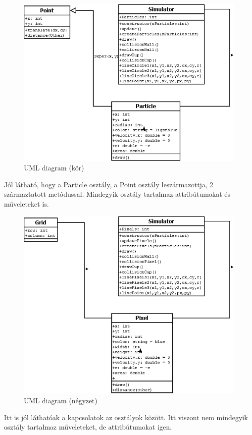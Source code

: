 \begin{figure}[h]
	\centering
	\includegraphics[width=\textwidth]{images/Diagram1.png}
	\caption{UML diagram (kör)}
	\label{fig:dia1}
\end{figure}


Jól látható, hogy a Particle osztály, a Point osztály leszármazottja, 2 származtatott metódussal.
Mindegyik osztály tartalmaz attribútumokat és műveleteket is.



\begin{figure}[h]
	\centering
	\includegraphics[width=\textwidth]{images/Diagram2.png}
	\caption{UML diagram (négyzet)}
	\label{fig:dia2}
\end{figure}


Itt is jól láthatóak a kapcsolatok az osztályok között. Itt viszont nem mindegyik osztály tartalmaz műveleteket, de attribútumokat igen. 


